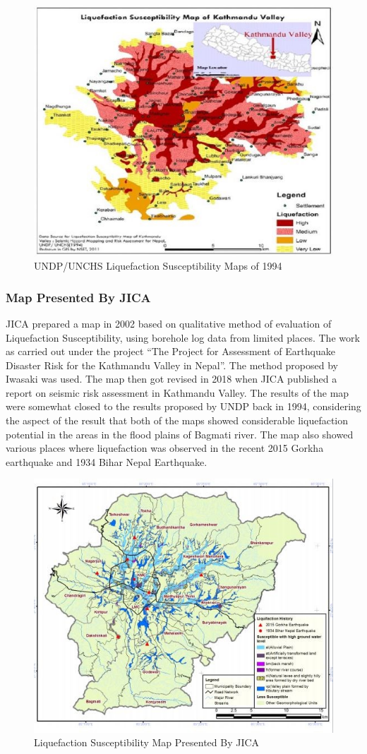 \begin{figure}[!hbt]
\centering
\includegraphics[width=0.75\linewidth,keepaspectratio]{images/main/undp_susceptibility.jpg}
\caption{UNDP/UNCHS Liquefaction Susceptibility Maps of 1994}
\end{figure}

\subsubsection{Map Presented By JICA}

JICA prepared a map in 2002 based on qualitative method of evaluation of Liquefaction Susceptibility, using borehole log data from limited places. The work as carried out under the project “The Project for Assessment of Earthquake Disaster Risk for the Kathmandu Valley in Nepal”. The method proposed by Iwasaki \cite{r26} was used. The map then got revised in 2018 when JICA published a report on seismic risk assessment in Kathmandu Valley. The results of the map were somewhat closed to the results proposed by UNDP back in 1994, considering the aspect of the result that both of the maps showed considerable liquefaction potential in the areas in the flood plains of Bagmati river. The map also showed various places where liquefaction was observed in the recent 2015 Gorkha earthquake and 1934 Bihar Nepal Earthquake.

\begin{figure}[!hbt]
\centering
\includegraphics[width=0.75\linewidth,keepaspectratio]{images/main/jica_sus.jpg}
\caption{Liquefaction Susceptibility Map Presented By JICA}
\end{figure}

